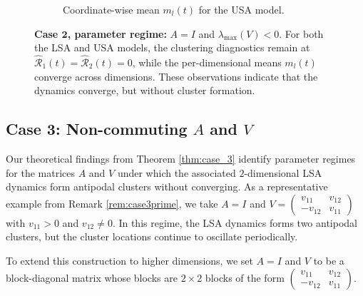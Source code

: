 \documentclass[10pt]{article}
\theoremstyle{definition}
\theoremstyle{definition}
\numberwithin{equation}{section}
\newcommand{\blue}{\color{blue}}
\newcommand{\CR}{\mathcal{R}}
\begin{document}
\begin{figure}[!htb]
\begin{subfigure}[t]{.48\textwidth}
\begin{minipage}[b][\subfigimgheightE][b]{\linewidth}
  \end{minipage}
  \caption{Coordinate-wise mean $m_l(t)$ for the USA model.}
  \label{subfig:case_2_USA_per_dim_mean}
\end{subfigure}
%
\caption{
\textbf{Case $\mathbf 2$, parameter regime:} $A=I$ and $\lambda_{\max}(V) < 0$.
For both the LSA and USA models, the clustering diagnostics remain at $\widehat{\CR}_1(t) = \widehat{\CR}_2(t) = 0$, while the per-dimensional means $m_l(t)$ converge across dimensions.
These observations indicate that the dynamics converge, but without cluster formation.
}
\label{fig:case2_eigneg_d100}
\end{figure}


\subsection{Case 3: Non-commuting \texorpdfstring{$A$}{A} and \texorpdfstring{$V$}{V}}
\label{sec:exp_case3}
Our theoretical findings from Theorem \ref{thm:case_3} identify parameter regimes for the matrices $A$ and $V$ under which the associated $2$-dimensional LSA dynamics form antipodal clusters without converging.
As a representative example from Remark \ref{rem:case3prime}, we take $A = I$ and $V = \left(\begin{smallmatrix} v_{11} & v_{12} \\ -v_{12} & v_{11} \end{smallmatrix}\right)$ with $v_{11} > 0$ and $v_{12} \neq 0$.
In this regime, the LSA dynamics forms two antipodal clusters, but the cluster locations continue to oscillate periodically.

To extend this construction to higher dimensions, we set $A=I$ and $V$ to be a block-diagonal matrix whose blocks are $2\times 2$ blocks of the form $\left(\begin{smallmatrix} v_{11} & v_{12} \\ -v_{12} & v_{11} \end{smallmatrix}\right)$.
\end{document}
